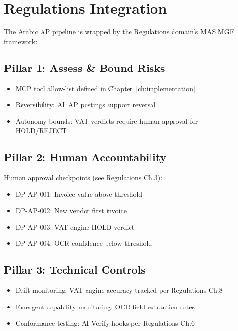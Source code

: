 \documentclass[11pt,a4paper,twoside]{report}
\begin{document}
\section{Regulations Integration}
\label{sec:reg-integration}

The Arabic AP pipeline is wrapped by the Regulations domain's MAS MGF framework:

\subsection{Pillar 1: Assess \& Bound Risks}

\begin{itemize}
  \item MCP tool allow-list defined in Chapter~\ref{ch:implementation}
  \item Reversibility: All AP postings support reversal
  \item Autonomy bounds: VAT verdicts require human approval for HOLD/REJECT
\end{itemize}

\subsection{Pillar 2: Human Accountability}

Human approval checkpoints (see Regulations Ch.3):
\begin{itemize}
  \item DP-AP-001: Invoice value above threshold
  \item DP-AP-002: New vendor first invoice
  \item DP-AP-003: VAT engine HOLD verdict
  \item DP-AP-004: OCR confidence below threshold
\end{itemize}

\subsection{Pillar 3: Technical Controls}

\begin{itemize}
  \item Drift monitoring: VAT engine accuracy tracked per Regulations Ch.8
  \item Emergent capability monitoring: OCR field extraction rates
  \item Conformance testing: AI Verify hooks per Regulations Ch.6
\end{itemize}
\end{document}
